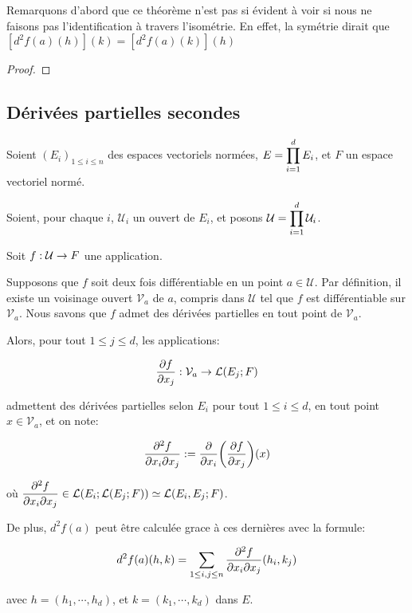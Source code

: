 Remarquons d'abord que ce théorème n'est pas si évident à voir si nous ne
faisons pas l'identification à travers l'isométrie. En effet, la symétrie dirait
que $[d^{2}f(a)(h)](k) = [d^{2}f(a)(k)](h)$

\ifdefined\outputproof
\begin{proof}

\end{proof}
\fi

\subsection{Dérivées partielles secondes}

Soient $(E_{i})_{1 \leq i \leq n}$ des espaces vectoriels normées, $E =
\displaystyle \prod_{i = 1}^{d} E_{i}$, et $F$ un espace vectoriel normé.

Soient, pour chaque $i$, $\mathcal{U}_{i}$ un ouvert de $E_{i}$, et posons
$\mathcal{U} = \displaystyle \prod_{i = 1}^{d} \mathcal{U}_{i}$.

Soit $f : \mathcal{U} \rightarrow F$ une application.

\begin{proposition}
	Supposons que $f$ soit deux fois différentiable en un point $a \in
	\mathcal{U}$. Par définition, il existe un voisinage ouvert
	$\mathcal{V}_{a}$ de $a$, compris dans $\mathcal{U}$ tel que $f$ est
	différentiable sur $\mathcal{V}_{a}$.
	Nous savons que $f$ admet des dérivées partielles en tout point de $\mathcal{V}_{a}$.

	Alors, pour tout $1 \leq j \leq d$, les applications:

	\begin{equation}
		\pdv{f}{x_{j}} : \mathcal{V}_{a} \rightarrow \mathcal{L}(E_{j}; F)
	\end{equation}

	admettent des dérivées partielles selon $E_{i}$ pour tout $1 \leq i \leq d$,
	en tout point $x \in \mathcal{V}_{a}$, et on note:

	\begin{equation}
		\pdv{f}{x_{i}}{x_{j}} (x) := \pdv{x_{i}}(\pdv{f}{x_{j}}) (x)
	\end{equation}

	où $\displaystyle \pdv{f}{x_{i}}{x_{j}} \in
	\mathcal{L}(E_{i}; \mathcal{L}(E_{j}; F)) \simeq
	\mathcal{L}(E_{i}, E_{j}; F)$.

	De plus, $d^{2}f(a)$ peut être calculée grace à ces dernières avec la
	formule:

	\begin{equation}
		d^{2}f(a)(h, k) = \displaystyle \sum_{1 \leq i, j \leq n}
		\pdv{f}{x_{i}}{x_{j}} (a) (h_{i}, k_{j})
	\end{equation}

	avec $h = (h_{1}, \cdots, h_{d})$, et $k = (k_{1}, \cdots, k_{d})$ dans $E$.

\end{proposition}

